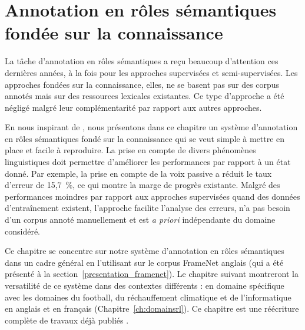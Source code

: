 \chapter{Annotation en rôles sémantiques fondée sur la connaissance}
\label{ch:srl}




La tâche d'annotation en rôles sémantiques a reçu beaucoup d'attention ces
dernières années, à la fois pour les approches supervisées et semi-supervisées.
Les approches fondées sur la connaissance, elles, ne se basent pas sur des
corpus annotés mais sur des ressources lexicales existantes. Ce type d'approche
a été négligé malgré leur complémentarité par rapport aux autres approches.

En nous inspirant de \citep{swier2004unsupervised,swier2005exploiting}, nous
présentons dans ce chapitre un système d'annotation en rôles sémantiques fondé
sur la connaissance qui se veut simple à mettre en place et facile à
reproduire. La prise en compte de divers phénomènes linguistiques doit
permettre d'améliorer les performances par rapport à un état donné. Par
exemple, la prise en compte de la voix passive a réduit le taux d'erreur de
15,7~\%, ce qui montre la marge de progrès existante. Malgré des performances
moindres par rapport aux approches supervisées quand des données d'entraînement
existent, l'approche facilite l'analyse des erreurs, n'a pas besoin d'un corpus
annoté manuellement et est \emph{a priori} indépendante du domaine considéré.

Ce chapitre se concentre sur notre système d'annotation en rôles sémantiques
dans un cadre général en l'utilisant sur le corpus FrameNet anglais (qui a été
présenté à la section~\ref{presentation_framenet}). Le chapitre suivant
montreront la versatilité de ce système dans des contextes différents : en
domaine spécifique avec les domaines du football, du réchauffement climatique
et de l'informatique en anglais et en français (Chapitre~\ref{ch:domainsrl}).
Ce chapitre est une réécriture complète de travaux déjà publiés
\citep{pradet2013revisiting}.

